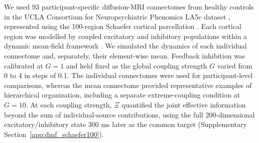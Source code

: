 \documentclass[fleqn,10pt]{wlscirep}
\newcommand{\rev}[1]{\textcolor{red}{#1}}
\theoremstyle{naturetheorem}
\begin{document}
We used 93 participant-specific diffusion-MRI connectomes from healthy controls in the UCLA Consortium for Neuropsychiatric Phenomics LA5c dataset \cite{Poldrack2016PhenomeWide}, represented using the 100-region Schaefer cortical parcellation \cite{Schaefer2018LocalGlobal}. Each cortical region was modelled by coupled excitatory and inhibitory populations within a dynamic mean-field framework \cite{Deco2014LocalEIRatio}. We simulated the dynamics of each individual connectome and, separately, their element-wise mean. Feedback inhibition was calibrated at $G=1$ and held fixed as the global coupling strength $G$ varied from 0 to 4 in steps of 0.1. The individual connectomes were used for participant-level comparisons, whereas the mean connectome provided representative examples of hierarchical organization, including a separate extreme-coupling condition at $G=10$. At each coupling strength, $\Xi$ quantified the joint effective information beyond the sum of individual-source contributions, using the full 200-dimensional excitatory/inhibitory state 300 ms later as the common target (Supplementary Section~\ref{app:dmf_schaefer100}).


\end{document}
